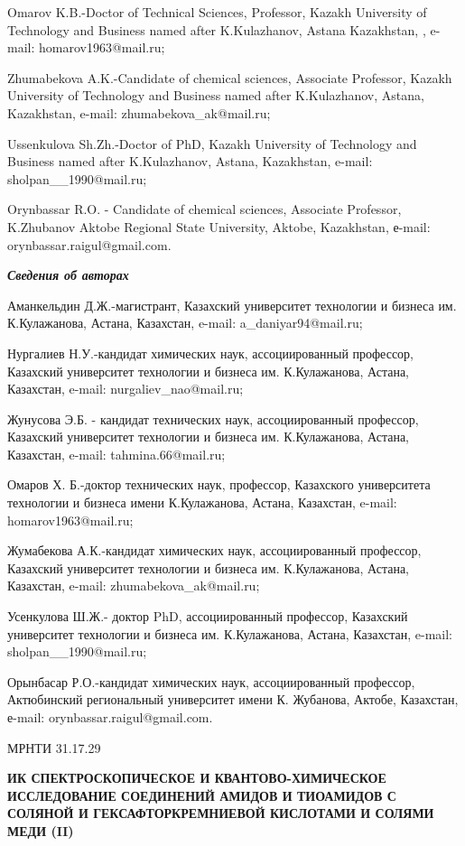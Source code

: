 Omarov K.B.-Doctor of Technical Sciences, Professor, Kazakh University
of Technology and Business named after K.Kulazhanov, Astana Kazakhstan,
, e-mail: homarov1963@mail.ru;

Zhumabekova A.K.-Candidate of chemical sciences, Associate Professor,
Kazakh University of Technology and Business named after K.Kulazhanov,
Astana, Kazakhstan, e-mail: zhumabekova\_ak@mail.ru;

Ussenkulova Sh.Zh.-Doctor of PhD, Kazakh University of Technology and
Business named after K.Kulazhanov, Astana, Kazakhstan, e-mail:
sholpan\_\_1990@mail.ru;

Orynbassar R.O. - Candidate of chemical sciences, Associate Professor,
K.Zhubanov Aktobe Regional State University, Aktobe, Kazakhstan, е-mail:
orynbassar.raigul@gmail.com.

\emph{\textbf{Сведения об авторах}}

Аманкельдин Д.Ж.-магистрант, Казахский университет технологии и бизнеса
им. К.Кулажанова, Астана, Казахстан, e-mail: a\_daniyar94@mail.ru;

Нургалиев Н.У.-кандидат химических наук, ассоциированный профессор,
Казахский университет технологии и бизнеса им. К.Кулажанова, Астана,
Казахстан, e-mail: nurgaliev\_nao@mail.ru;

Жунусова Э.Б. - кандидат технических наук, ассоциированный профессор,
Казахский университет технологии и бизнеса им. К.Кулажанова, Астана,
Казахстан, e-mail: tahmina.66@mail.ru;

Омаров Х. Б.-доктор технических наук, профессор, Казахского университета
технологии и бизнеса имени К.Кулажанова, Астана, Казахстан, e-mail:
homarov1963@mail.ru;

Жумабекова А.К.-кандидат химических наук, ассоциированный профессор,
Казахский университет технологии и бизнеса им. К.Кулажанова, Астана,
Казахстан, e-mail: zhumabekova\_ak@mail.ru;

Усенкулова Ш.Ж.- доктор PhD, ассоциированный профессор, Казахский
университет технологии и бизнеса им. К.Кулажанова, Астана, Казахстан,
e-mail: sholpan\_\_1990@mail.ru;

Орынбасар Р.О.-кандидат химических наук, ассоциированный профессор,
Актюбинский региональный университет имени К. Жубанова, Актобе,
Казахстан, е-mail: orynbassar.raigul@gmail.com.

МРНТИ 31.17.29

\textbf{ИК СПЕКТРОСКОПИЧЕСКОЕ И КВАНТОВО-ХИМИЧЕСКОЕ ИССЛЕДОВАНИЕ
СОЕДИНЕНИЙ АМИДОВ И ТИОАМИДОВ С СОЛЯНОЙ И ГЕКСАФТОРКРЕМНИЕВОЙ КИСЛОТАМИ
И СОЛЯМИ МЕДИ (II)}

